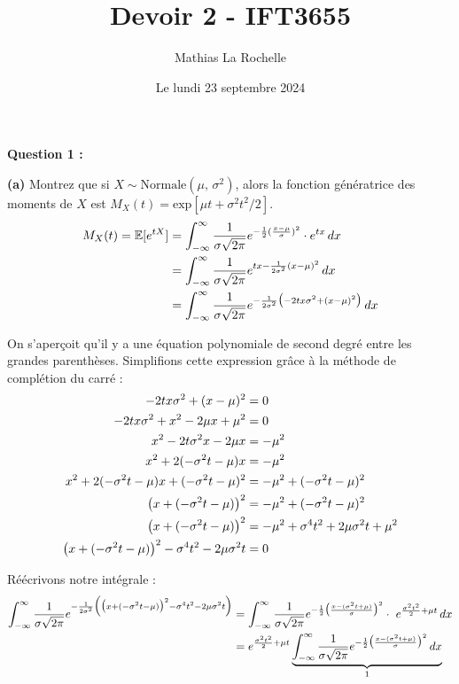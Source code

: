 \documentclass[10pt,a4paper]{article}
\title{Devoir 2 - IFT3655}
\author{Mathias La Rochelle}
\date{Le lundi 23 septembre 2024}
\begin{document}
	\maketitle
	\textbf{Question 1 :}

	\vspace{.2cm}
	\textbf{(a)} Montrez que si \(X \sim \text{Normale}(\mu,\, \sigma^2)\), alors la fonction génératrice des moments de $X$ est \(M_X(t) = \text{exp}[\mu t + \sigma^2 t^2/2]\).
	\begin{align}
		M_X(t) = \mathbb{E}[e^{tX}] &= \int_{-\infty}^\infty \frac{1}{\sigma\sqrt{2\pi}} e^{-\frac{1}{2} (\frac{x - \mu}{\sigma})^2} \cdot e^{tx}\, dx \notag \\
		&= \int_{-\infty}^\infty \frac{1}{\sigma\sqrt{2\pi}} e^{tx - \frac{1}{2\sigma^2} (x - \mu)^2}\, dx \notag \\
		&= \int_{-\infty}^\infty \frac{1}{\sigma\sqrt{2\pi}} e^{-\frac{1}{2\sigma^2} \big(-2tx\sigma^2 + (x - \mu)^2\big)}\, dx \notag
	\end{align}

	On s'aperçoit qu'il y a une équation polynomiale de second degré entre les grandes parenthèses. Simplifions cette expression grâce à la méthode de complétion du carré :
	\begin{align}
		-2tx\sigma^2 + (x - \mu)^2 &= 0 \notag \\
		-2tx\sigma^2 + x^2 -2\mu x + \mu^2 &= 0 \notag \\
		x^2 - 2t\sigma^2 x - 2\mu x &= -\mu^2 \notag \\
		x^2 + 2(-\sigma^2 t - \mu)x &= -\mu^2 \notag \\
		x^2 + 2(-\sigma^2 t - \mu)x + (-\sigma^2 t - \mu)^2 &= -\mu^2 + (-\sigma^2 t - \mu)^2 \notag \\
		\big(x + (-\sigma^2 t - \mu)\big)^2 &= -\mu^2 + (-\sigma^2 t - \mu)^2 \notag \\
		\big(x + (-\sigma^2 t - \mu)\big)^2 &= -\mu^2 + \sigma^4t^2 + 2\mu\sigma^2 t + \mu^2 \notag \\
		\big(x + (-\sigma^2 t - \mu)\big)^2 - \sigma^4t^2 - 2\mu\sigma^2 t &= 0 \notag
	\end{align}

	Réécrivons notre intégrale :
	\begin{align}
		\int_{-\infty}^\infty \frac{1}{\sigma\sqrt{2\pi}} e^{-\frac{1}{2\sigma^2} \Big(\big(x + (-\sigma^2 t - \mu)\big)^2 - \sigma^4t^2 - 2\mu\sigma^2 t\Big)} &= \int_{-\infty}^\infty \frac{1}{\sigma\sqrt{2\pi}} e^{-\frac{1}{2}\big(\frac{x - (\sigma^2 t + \mu)}{\sigma}\big)^2} \cdot\ e^{\frac{\sigma^2 t^2}{2} + \mu t}\, dx \notag \\
		&=  e^{\frac{\sigma^2 t^2}{2} + \mu t} \underbrace{\int_{-\infty}^\infty \frac{1}{\sigma\sqrt{2\pi}} e^{-\frac{1}{2}\big(\frac{x - (\sigma^2 t + \mu)}{\sigma}\big)^2}\, dx}_\text{1} \notag
	\end{align}
\end{document}
